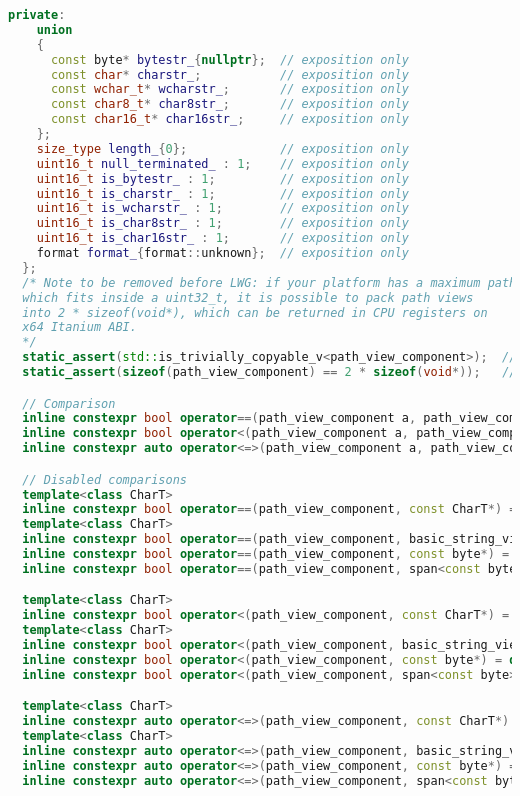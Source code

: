\documentclass[11pt]{article}
\begin{document}
\begin{lstlisting}[language=cpp]
  private:
    union
    {
      const byte* bytestr_{nullptr};  // exposition only
      const char* charstr_;           // exposition only
      const wchar_t* wcharstr_;       // exposition only
      const char8_t* char8str_;       // exposition only
      const char16_t* char16str_;     // exposition only
    };
    size_type length_{0};             // exposition only
    uint16_t null_terminated_ : 1;    // exposition only
    uint16_t is_bytestr_ : 1;         // exposition only
    uint16_t is_charstr_ : 1;         // exposition only
    uint16_t is_wcharstr_ : 1;        // exposition only
    uint16_t is_char8str_ : 1;        // exposition only
    uint16_t is_char16str_ : 1;       // exposition only
    format format_{format::unknown};  // exposition only
  };
  /* Note to be removed before LWG: if your platform has a maximum path size
  which fits inside a uint32_t, it is possible to pack path views
  into 2 * sizeof(void*), which can be returned in CPU registers on
  x64 Itanium ABI.
  */
  static_assert(std::is_trivially_copyable_v<path_view_component>);  // to be removed before LWG
  static_assert(sizeof(path_view_component) == 2 * sizeof(void*));   // to be removed before LWG

  // Comparison
  inline constexpr bool operator==(path_view_component a, path_view_component b) noexcept;
  inline constexpr bool operator<(path_view_component a, path_view_component b) noexcept;
  inline constexpr auto operator<=>(path_view_component a, path_view_component b) = default;

  // Disabled comparisons
  template<class CharT>
  inline constexpr bool operator==(path_view_component, const CharT*) = delete;
  template<class CharT>
  inline constexpr bool operator==(path_view_component, basic_string_view<CharT>) = delete;
  inline constexpr bool operator==(path_view_component, const byte*) = delete;
  inline constexpr bool operator==(path_view_component, span<const byte>) = delete;

  template<class CharT>
  inline constexpr bool operator<(path_view_component, const CharT*) = delete;
  template<class CharT>
  inline constexpr bool operator<(path_view_component, basic_string_view<CharT>) = delete;
  inline constexpr bool operator<(path_view_component, const byte*) = delete;
  inline constexpr bool operator<(path_view_component, span<const byte>) = delete;

  template<class CharT>
  inline constexpr auto operator<=>(path_view_component, const CharT*) = delete;
  template<class CharT>
  inline constexpr auto operator<=>(path_view_component, basic_string_view<CharT>) = delete;
  inline constexpr auto operator<=>(path_view_component, const byte*) = delete;
  inline constexpr auto operator<=>(path_view_component, span<const byte>) = delete;


\end{lstlisting}
\end{document}
